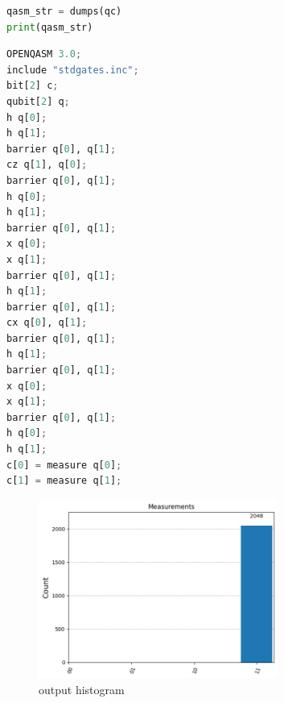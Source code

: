 \begin{lstlisting}[language=Python, caption={Export circuit to QASM3}, label={lst:qasm-export}]
qasm_str = dumps(qc)
print(qasm_str)
\end{lstlisting}

\begin{lstlisting}[language=Python, caption={Output generato: OpenQASM 3}, label={lst:qasm3-output}, backgroundcolor=\color{bg}]
OPENQASM 3.0;
include "stdgates.inc";
bit[2] c;
qubit[2] q;
h q[0];
h q[1];
barrier q[0], q[1];
cz q[1], q[0];
barrier q[0], q[1];
h q[0];
h q[1];
barrier q[0], q[1];
x q[0];
x q[1];
barrier q[0], q[1];
h q[1];
barrier q[0], q[1];
cx q[0], q[1];
barrier q[0], q[1];
h q[1];
barrier q[0], q[1];
x q[0];
x q[1];
barrier q[0], q[1];
h q[0];
h q[1];
c[0] = measure q[0];
c[1] = measure q[1];
\end{lstlisting}

\begin{figure}[H]
    \centering
    \includegraphics[width=0.7\textwidth]{images/histograms.png}
    \caption{output histogram}
    \label{fig:output histogram}
\end{figure}
